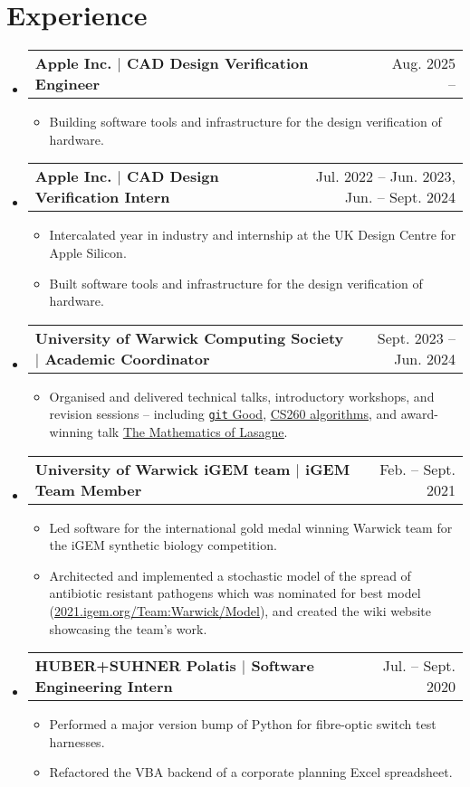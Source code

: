 \documentclass[letterpaper,11pt]{article}
\makeatletter
\newcommand{\resumeItem}[1]{
  \item\small{
    {#1 \vspace{-2pt}}
  }
}
\newcommand{\resumeProjectHeading}[2]{
    \item
    \begin{tabular*}{0.97\textwidth}{l@{\extracolsep{\fill}}r}
      \textbf{#1} & #2 \\
    \end{tabular*}\vspace{-7pt}
}
\newcommand{\resumeSubHeadingListStart}{\begin{itemize}[leftmargin=0.15in, label={}]}
\newcommand{\resumeSubHeadingListEnd}{\end{itemize}}
\newcommand{\resumeItemListStart}{\begin{itemize}[leftmargin=0.2in]}
\newcommand{\resumeItemListEnd}{\end{itemize}\vspace{-5pt}}
\makeatother
\begin{document}
\section{Experience}
  \resumeSubHeadingListStart
    \resumeProjectHeading
      {Apple Inc. $|$ CAD Design Verification Engineer}{Aug. 2025 -- }
      \resumeItemListStart
        \resumeItem{Building software tools and infrastructure for the design verification of hardware.}
      \resumeItemListEnd
    \resumeProjectHeading
      {Apple Inc. $|$ CAD Design Verification Intern}{Jul. 2022 -- Jun. 2023, Jun. -- Sept. 2024}
      \resumeItemListStart
        \resumeItem{Intercalated year in industry and internship at the UK Design Centre for Apple Silicon.}
        \resumeItem{Built software tools and infrastructure for the design verification of hardware.}
      \resumeItemListEnd
    \resumeProjectHeading
      {University of Warwick Computing Society $|$ Academic Coordinator}{Sept. 2023 -- Jun. 2024}
      \resumeItemListStart
        \resumeItem{Organised and delivered technical talks, introductory workshops, and revision sessions -- including \href{https://edmundgoodman.co.uk/files/posts/git\_good/git\_good\_2023.pdf}{\underline{\texttt{git} Good}}, \href{https://edmundgoodman.co.uk/posts/2023/cs260-algorithms-revision-lecture/}{\underline{CS260 algorithms}}, and award-winning talk \href{https://edmundgoodman.co.uk/posts/2023/the-mathematics-of-lasagne/}{\underline{The Mathematics of Lasagne}}.}
      \resumeItemListEnd
    \resumeProjectHeading
      {University of Warwick iGEM team $|$ iGEM Team Member}{Feb. -- Sept. 2021}
      \resumeItemListStart
        \resumeItem{Led software for the international gold medal winning Warwick team for the iGEM synthetic biology competition.}
        \resumeItem{Architected and implemented a stochastic model of the spread of antibiotic resistant pathogens which was nominated for best model (\href{https://2021.igem.org/Team:Warwick/Model}{\underline{2021.igem.org/Team:Warwick/Model}}), and created the wiki website showcasing the team's work.}
    \resumeItemListEnd
    \resumeProjectHeading
      {HUBER+SUHNER Polatis $|$ Software Engineering Intern}{Jul. -- Sept. 2020}
      \resumeItemListStart
        \resumeItem{Performed a major version bump of Python for fibre-optic switch test harnesses.}
        \resumeItem{Refactored the VBA backend of a corporate planning Excel spreadsheet.}
      \resumeItemListEnd
      \resumeSubHeadingListEnd

\end{document}
